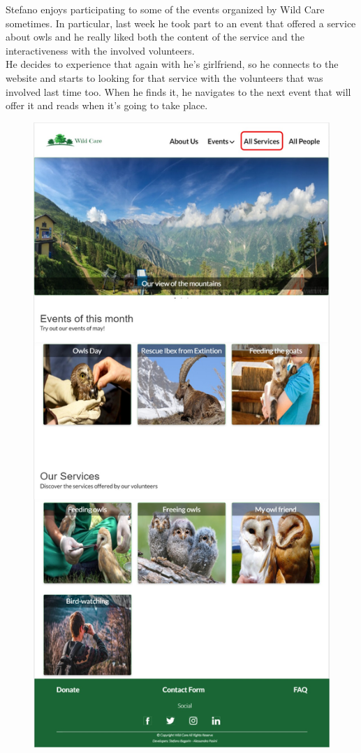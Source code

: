 Stefano enjoys participating to some of the events organized by Wild Care sometimes. In particular, last week he took part to an event that offered a service about owls and he really liked both the content of the service and the interactiveness with the involved volunteers.\\
He decides to experience that again with he's girlfriend, so he connects to the website and starts to looking for that service with the volunteers that was involved last time too. When he finds it, he navigates to the next event that will offer it and reads when it's going to take place.

	\begin{figure}[h!]
		\centering
		\begin{minipage}[b]{0.8\textwidth}
    			\includegraphics[width= \textwidth]{./assets/mockups/homepage_services.jpg}

\end{minipage}
\end{figure}
